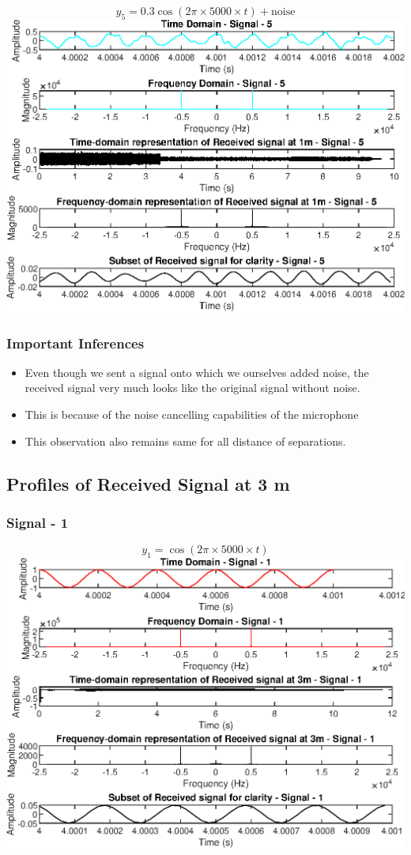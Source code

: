 \documentclass{report}
\begin{document}
$$ y_5 = 0.3 \cos(2\pi \times 5000 \times t) + \text{noise} $$
\includegraphics[width=1.1\linewidth]{1_5.eps}

\subsubsection{Important Inferences}
\begin{itemize}
\item Even though we sent a signal onto which we ourselves added noise, the received signal very much looks like the original signal without noise.
\item This is because of the noise cancelling capabilities of the microphone
\item This observation also remains same for all distance of separations.
\end{itemize}


\newpage
\subsection{Profiles of Received Signal at 3 m }


\subsubsection{Signal - 1}

$$ y_1 = \cos(2\pi \times 5000 \times t) $$
\includegraphics[width=1.1\linewidth]{3_1.eps}
\end{document}
